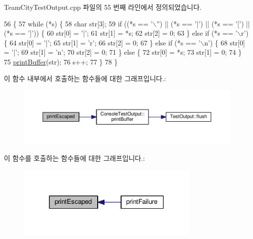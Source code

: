 Team\+City\+Test\+Output.\+cpp 파일의 55 번째 라인에서 정의되었습니다.


\begin{DoxyCode}
56 \{
57     \textcolor{keywordflow}{while} (*s) \{
58         \textcolor{keywordtype}{char} str[3];
59         \textcolor{keywordflow}{if} ((*s == \textcolor{charliteral}{'\(\backslash\)''}) || (*s == \textcolor{charliteral}{'|'}) || (*s == \textcolor{charliteral}{'['}) || (*s == \textcolor{charliteral}{']'})) \{
60             str[0] = \textcolor{charliteral}{'|'};
61             str[1] = *s;
62             str[2] = 0;
63         \} \textcolor{keywordflow}{else} \textcolor{keywordflow}{if} (*s == \textcolor{charliteral}{'\(\backslash\)r'}) \{
64             str[0] = \textcolor{charliteral}{'|'};
65             str[1] = \textcolor{charliteral}{'r'};
66             str[2] = 0;
67         \} \textcolor{keywordflow}{else} \textcolor{keywordflow}{if} (*s == \textcolor{charliteral}{'\(\backslash\)n'}) \{
68             str[0] = \textcolor{charliteral}{'|'};
69             str[1] = \textcolor{charliteral}{'n'};
70             str[2] = 0;
71         \} \textcolor{keywordflow}{else} \{
72             str[0] = *s;
73             str[1] = 0;
74         \}
75         \hyperlink{class_console_test_output_a8b83bd531b9e38a5dd9c61e14bf1636c}{printBuffer}(str);
76         s++;
77     \}
78 \}
\end{DoxyCode}


이 함수 내부에서 호출하는 함수들에 대한 그래프입니다.\+:
\nopagebreak
\begin{figure}[H]
\begin{center}
\leavevmode
\includegraphics[width=350pt]{class_team_city_test_output_a172e95876c8993ddb5cbf83b47a82261_cgraph}
\end{center}
\end{figure}




이 함수를 호출하는 함수들에 대한 그래프입니다.\+:
\nopagebreak
\begin{figure}[H]
\begin{center}
\leavevmode
\includegraphics[width=255pt]{class_team_city_test_output_a172e95876c8993ddb5cbf83b47a82261_icgraph}
\end{center}
\end{figure}


